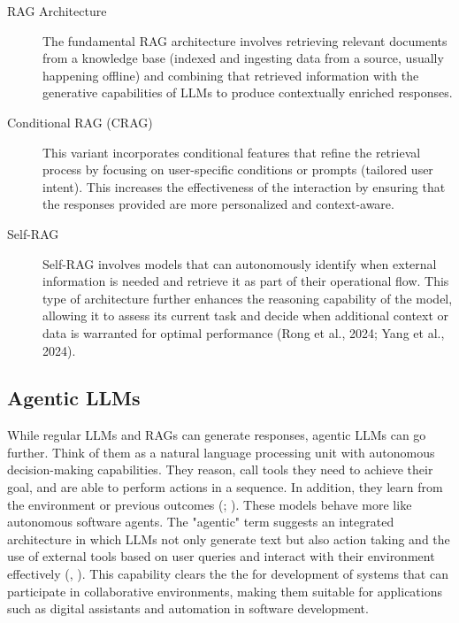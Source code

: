 \begin{description}
    \item[RAG Architecture] The fundamental RAG architecture involves retrieving relevant documents from a knowledge base (indexed and ingesting data from a source, usually happening offline) and combining that retrieved information with the generative capabilities of LLMs to produce contextually enriched responses.

    \item[Conditional RAG (CRAG)] This variant incorporates conditional features that refine the retrieval process by focusing on user-specific conditions or prompts (tailored user intent). This increases the effectiveness of the interaction by ensuring that the responses provided are more personalized and context-aware.

    \item[Self-RAG] Self-RAG involves models that can autonomously identify when external information is needed and retrieve it as part of their operational flow. This type of architecture further enhances the reasoning capability of the model, allowing it to assess its current task and decide when additional context or data is warranted for optimal performance (Rong et al., 2024; Yang et al., 2024).
\end{description}


\subsection{Agentic LLMs} 
\label{subsec:background:first_section:third_subsection}

While regular LLMs and RAGs can generate responses, agentic LLMs can go further. Think of them as a natural language processing unit with autonomous decision-making capabilities. They reason, call tools they need to achieve their goal, and are able to perform actions in a sequence. In addition, they learn from the environment or previous outcomes (\cite{yao_react_2023}; \cite{xi_rise_2023}). These models behave more like autonomous software agents. The "agentic" term suggests an integrated architecture in which LLMs not only generate text but also action taking and the use of external tools based on user queries and interact with their environment effectively (\cite{li_advanced_2024}, \cite{li_review_2024}). This capability clears the the for development of systems that can participate in collaborative environments, making them suitable for applications such as digital assistants and automation in software development.

